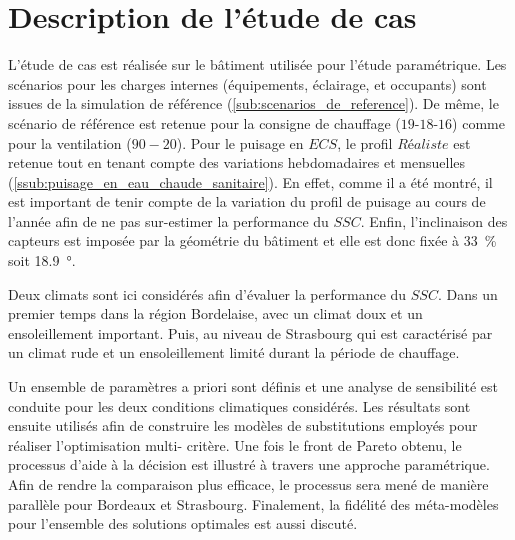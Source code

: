 





\section{Description de l’étude de cas} %
\label{sec:description_de_l_etude_de_cas}
L’étude de cas est réalisée sur le bâtiment utilisée pour l’étude paramétrique.
Les scénarios pour les charges internes (équipements, éclairage, et occupants) sont
issues de la simulation de référence (\ref{sub:scenarios_de_reference}). De même,
le scénario de référence est retenue pour la consigne de chauffage ($19$-$18$-$16$)
comme pour la ventilation ($90-20$).
Pour le puisage en $ECS$, le profil $Réaliste$ est retenue tout en tenant compte des
variations hebdomadaires et mensuelles (\ref{ssub:puisage_en_eau_chaude_sanitaire}).
En effet, comme il a été montré, il est important de tenir compte de la variation
du profil de puisage au cours de l’année afin de ne pas sur-estimer la performance
du $SSC$. Enfin, l’inclinaison des capteurs est imposée par la géométrie du bâtiment et
elle est donc fixée à \SI{33}{\percent} soit \SI{18.9}{\degree}.

Deux climats sont ici considérés afin d’évaluer la performance du $SSC$. Dans un premier temps
dans la région Bordelaise, avec un climat doux et un ensoleillement important. Puis,
au niveau de Strasbourg qui est caractérisé par un climat rude et un ensoleillement
limité durant la période de chauffage.

Un ensemble de paramètres a priori sont définis et une analyse de sensibilité est conduite
pour les deux conditions climatiques considérés. Les résultats sont ensuite utilisés afin
de construire les modèles de substitutions employés pour réaliser l’optimisation multi-
critère. Une fois le front de Pareto obtenu, le processus d’aide à la décision est
illustré à travers une approche paramétrique. Afin de rendre la comparaison plus efficace,
le processus sera mené de manière parallèle pour Bordeaux et Strasbourg. Finalement, la
fidélité des méta-modèles pour l’ensemble des solutions optimales est aussi discuté.



